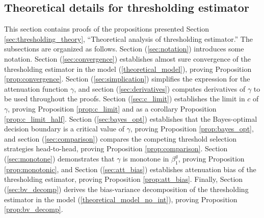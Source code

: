 \documentclass[12pt]{article}
\begin{document}
\begin{appendices}
\section{Theoretical details for thresholding estimator}
This section contains proofs of the propositions presented Section \ref{sec:thresholding_theory}, ``Theoretical analysis of thresholding estimator.'' The subsections are organized as follows. Section (\ref{sec:notation}) introduces some notation. Section (\ref{sec:convergence}) establishes almost sure convergence of the thresholding estimator in the model (\ref{theoretical_model}), proving Proposition \ref{prop:convergence}. Section (\ref{sec:simplication}) simplifies the expression for the attenuation function $\gamma$, and section (\ref{sec:derivatives})  computes derivatives of $\gamma$ to be used throughout the proofs. Section (\ref{sec:c_limit}) establishes the limit in $c$ of $\gamma$, proving Proposition \ref{prop:c_limit} and as a corollary Proposition \ref{prop:c_limit_half}. Section (\ref{sec:bayes_opt}) establishes that the Bayes-optimal decision boundary is a critical value of $\gamma$, proving Proposition \ref{prop:bayes_opt}, and section (\ref{sec:comparison}) compares the competing threshold selection strategies head-to-head, proving Proposition \ref{prop:comparison}. Section (\ref{sec:monotone}) demonstrates that $\gamma$ is monotone in $\beta^g_1$, proving Proposition \ref{prop:monotonic}, and Section (\ref{sec:att_bias}) establishes attenuation bias of the thresholding estimator, proving Proposition \ref{prop:att_bias}. Finally, Section (\ref{sec:bv_decomp}) derives the bias-variance decomposition of the thresholding estimator in the model (\ref{theoretical_model_no_int}), proving Proposition \ref{prop:bv_decomp}.




\end{appendices}
\end{document}
